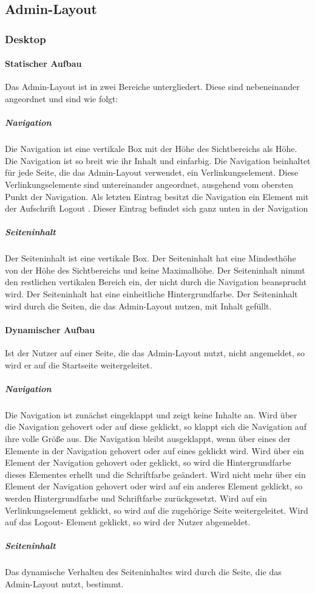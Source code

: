 \subsection{Admin-Layout}

\subsubsection{Desktop}
\paragraph*{Statischer Aufbau}
Das Admin-Layout ist in zwei Bereiche untergliedert. Diese sind nebeneinander angeordnet und sind wie folgt:

\subparagraph*{Navigation}
Die Navigation ist eine vertikale Box mit der Höhe des Sichtbereichs als Höhe.
Die Navigation ist so breit wie ihr Inhalt und einfarbig.
Die Navigation beinhaltet für jede Seite, die das Admin-Layout verwendet, ein Verlinkungselement. 
Diese Verlinkungselemente sind untereinander angeordnet, ausgehend vom obersten Punkt der Navigation.
Als letzten Eintrag besitzt die Navigation ein Element mit der Aufschrift \dq Logout \dq. Dieser Eintrag befindet sich ganz unten in der Navigation

\subparagraph*{Seiteninhalt}
Der Seiteninhalt ist eine vertikale Box. Der Seiteninhalt hat eine Mindesthöhe von der Höhe des Sichtbereichs und keine Maximalhöhe.
Der Seiteninhalt nimmt den restlichen vertikalen Bereich ein, der nicht durch die Navigation beansprucht wird.
Der Seiteninhalt hat eine einheitliche Hintergrundfarbe.
Der Seiteninhalt wird durch die Seiten, die das Admin-Layout nutzen, mit Inhalt gefüllt.

\paragraph*{Dynamischer Aufbau}
Ist der Nutzer auf einer Seite, die das Admin-Layout nutzt, nicht angemeldet, so wird er auf die Startseite weitergeleitet.

\subparagraph*{Navigation}
Die Navigation ist zunächst eingeklappt und zeigt keine Inhalte an. Wird über die Navigation gehovert oder auf diese geklickt,
so klappt sich die Navigation auf ihre volle Größe aus. Die Navigation bleibt ausgeklappt, wenn über eines der Elemente in der Navigation gehovert oder auf eines geklickt wird.
Wird über ein Element der Navigation gehovert oder geklickt, so wird die Hintergrundfarbe dieses Elementes erhellt und die Schriftfarbe geändert.
Wird nicht mehr über ein Element der Navigation gehovert oder wird auf ein anderes Element geklickt, so werden Hintergrundfarbe und Schriftfarbe zurückgesetzt.
Wird auf ein Verlinkungselement geklickt, so wird auf die zugehörige Seite weitergeleitet.
Wird auf das \dq Logout\dq - Element geklickt, so wird der Nutzer abgemeldet.

\subparagraph*{Seiteninhalt}
Das dynamische Verhalten des Seiteninhaltes wird durch die Seite, die das Admin-Layout nutzt, bestimmt.